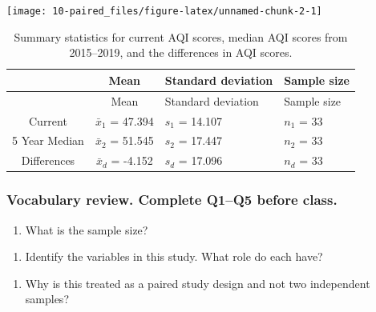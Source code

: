 \documentclass[
]{report}
\providecommand{\tightlist}{%
  \setlength{\itemsep}{0pt}\setlength{\parskip}{0pt}}
\begin{document}
\vspace{.05in}

\begin{center}\texttt{[image: 10-paired\_files/figure-latex/unnamed-chunk-2-1]} \end{center}

\vspace{.2in}

\begin{longtable}[]{@{}ccll@{}}
\caption{Summary statistics for current AQI scores, median AQI scores from 2015--2019, and the differences in AQI scores.}\tabularnewline
\toprule
& Mean & Standard deviation & Sample size\tabularnewline
\midrule
\endfirsthead
\toprule
& Mean & Standard deviation & Sample size\tabularnewline
\midrule
\endhead
Current & \(\bar{x}_1\) = 47.394 & \(s_1\) = 14.107 & \(n_1\) = 33\tabularnewline
5 Year Median & \(\bar{x}_2\) = 51.545 & \(s_2\) = 17.447 & \(n_2\) = 33\tabularnewline
Differences & \(\bar{x}_d\) = -4.152 & \(s_d\) = 17.096 & \(n_d\) = 33\tabularnewline
\bottomrule
\end{longtable}

\newpage

\hypertarget{vocabulary-review.-complete-q1q5-before-class.}{%
\subsubsection*{Vocabulary review. Complete Q1--Q5 before class.}\label{vocabulary-review.-complete-q1q5-before-class.}}

\begin{enumerate}
\def\labelenumi{\arabic{enumi}.}
\tightlist
\item
  What is the sample size?
\end{enumerate}

\vspace{0.5in}

\begin{enumerate}
\def\labelenumi{\arabic{enumi}.}
\setcounter{enumi}{1}
\tightlist
\item
  Identify the variables in this study. What role do each have?
\end{enumerate}

\vspace{.8in}

\begin{enumerate}
\def\labelenumi{\arabic{enumi}.}
\setcounter{enumi}{2}
\tightlist
\item
  Why is this treated as a paired study design and not two independent samples?
\end{enumerate}
\end{document}
